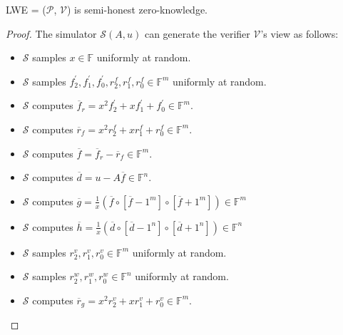 \begin{lemma}
\label{lemma:lwezk}

LWE = ($\mathcal{P}$, $\mathcal{V}$) is semi-honest zero-knowledge.

\end{lemma}
\begin{proof}

The simulator $\mathcal{S}(A, u)$ can generate the verifier $\mathcal{V}$'s view as follows:

\begin{itemize}

    \item $\mathcal{S}$ samples $x \in \mathbb{F}$ uniformly at random.
    
    \item $\mathcal{S}$ samples $f_2^\prime, f_1^\prime, f_0^\prime, r_2^f, r_1^f, r_0^f \in \mathbb{F}^m$ uniformly at random.
    
    \item $\mathcal{S}$ computes $\overline{f}_r = x^2 f_2^\prime + x f_1^\prime + f_0^\prime \in \mathbb{F}^m$.
    
    \item $\mathcal{S}$ computes $\overline{r}_f = x^2 r_2^f + x r_1^f + r_0^f \in \mathbb{F}^m$.
    
    \item $\mathcal{S}$ computes $\overline{f} = \overline{f}_r - \overline{r}_f \in \mathbb{F}^m$.
    
    \item $\mathcal{S}$ computes $\overline{d} = u - A\overline{f} \in \mathbb{F}^n$.
    
    \item $\mathcal{S}$ computes $\overline{g} = \frac{1}{x} (\overline{f} \circ [\overline{f} - 1^m] \circ [\overline{f} + 1^m]) \in \mathbb{F}^m$
    
    \item $\mathcal{S}$ computes $\overline{h} = \frac{1}{x} (\overline{d} \circ [\overline{d} - 1^n] \circ [\overline{d} + 1^n]) \in \mathbb{F}^n$

    \item $\mathcal{S}$ samples $r_2^v, r_1^v, r_0^v \in \mathbb{F}^m$ uniformly at random.
    
    \item $\mathcal{S}$ samples $r_2^w, r_1^w, r_0^w \in \mathbb{F}^n$ uniformly at random.

    \item $\mathcal{S}$ computes $\overline{r}_g = x^2 r_2^v + x r_1^v + r_0^v \in \mathbb{F}^m$.


\end{itemize}
\end{proof}
